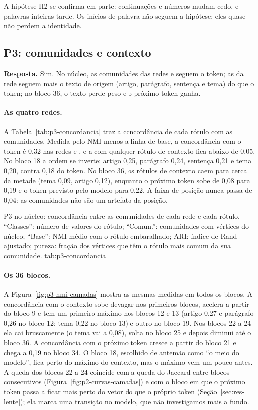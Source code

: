 A hipótese H2 se confirma em parte: continuações e números mudam cedo, e palavras inteiras
tarde. Os inícios de palavra não seguem a hipótese: eles quase não perdem a identidade.

\subsection{P3: comunidades e contexto}\label{sec:res-p3}

\textbf{Resposta.} Sim. No núcleo, as comunidades das redes  e  seguem o
token; as da rede  seguem mais o texto de origem (artigo, parágrafo, sentença e tema)
do que o token; no bloco 36, o texto perde peso e o próximo token ganha.

\paragraph{As quatro redes.} A Tabela~\ref{tab:p3-concordancia} traz a concordância de cada
rótulo com as comunidades. Medida pelo NMI menos a linha de base, a concordância com o token é
0,32 nas redes  e , e a com qualquer rótulo de contexto fica abaixo de 0,05.
No bloco 18 a ordem se inverte: artigo 0,25, parágrafo 0,24, sentença 0,21 e tema 0,20, contra
0,18 do token. No bloco 36, os rótulos de contexto caem para cerca da metade (tema 0,09, artigo
0,12), enquanto o próximo token sobe de 0,08 para 0,19 e o token previsto pelo modelo para
0,22. A faixa de posição nunca passa de 0,04: as comunidades não são um artefato da posição.

    {P3 no núcleo: concordância entre as comunidades de cada rede e cada rótulo. ``Classes'':
    número de valores do rótulo; ``Comun.'': comunidades com vértices do núcleo; ``Base'': NMI
    médio com o rótulo embaralhado; ARI: índice de Rand ajustado; pureza: fração dos vértices
    que têm o rótulo mais comum da sua comunidade.}
    {tab:p3-concordancia}

\paragraph{Os 36 blocos.} A Figura~\ref{fig:p3-nmi-camadas} mostra as mesmas medidas em todos
os blocos. A concordância com o contexto sobe devagar nos primeiros blocos, acelera a partir do
bloco 9 e tem um primeiro máximo nos blocos 12 e 13 (artigo 0,27 e parágrafo 0,26 no bloco 12; tema 0,22 no bloco 13) e outro no
bloco 19. Nos blocos 22 a 24 ela cai bruscamente (o tema vai a 0,08), volta no bloco 25 e
depois diminui até o bloco 36. A concordância com o próximo token cresce a partir do bloco 21 e
chega a 0,19 no bloco 34. O bloco 18, escolhido de antemão como ``o meio do modelo'', fica
perto do máximo do contexto, mas o máximo vem um pouco antes. A queda dos blocos 22 a 24
coincide com a queda do Jaccard entre blocos consecutivos (Figura~\ref{fig:p2-curvas-camadas})
e com o bloco em que o próximo token passa a ficar mais perto do vetor do que o próprio token
(Seção~\ref{sec:res-lente}); ela marca uma transição no modelo, que não investigamos mais a
fundo.

